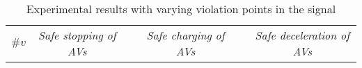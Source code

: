     \begin{table*}[t]
        \centering
            \caption{Experimental results with varying violation points in the signal}
            \vspace{-0.32cm}
            \label{tab:performance}
            \begin{center}
                \begin{tabular}{@{}ccccccccc@{}}
                    \toprule
                    \multirow{2}{*}{$\#v$} & \multicolumn{2}{c}{\textit{Safe stopping of AVs}} &~& \multicolumn{2}{c}{\textit{Safe charging of AVs}} &~& \multicolumn{2}{c}{\textit{Safe deceleration of AVs}} \\

\end{tabular}
\end{center}
\end{table*}

